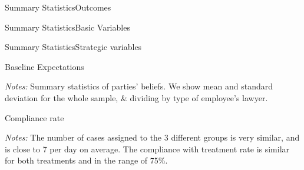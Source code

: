 \documentclass[9pt]{beamer}
\newcommand{\folder}{../Paper/Tables}
\begin{document}



\begin{frame}{Summary Statistics}{Outcomes}
  \begin{table}[H]
    \label{Sum_Stats_outcomes}
    \begin{center}
       \tiny{}
    \end{center}
\end{table}
\end{frame}

\begin{frame}{Summary Statistics}{Basic Variables}
  \begin{table}[H]
    \label{Sum_Stats_basic_variables}
    \begin{center}
       \tiny{}
    \end{center}
\end{table}
\end{frame}

\begin{frame}{Summary Statistics}{Strategic variables}
  \begin{table}[H]
    \label{Sum_Stats_strategic_variables}
    \begin{center}
       \tiny{}
    \end{center}
\end{table}
\end{frame}

\begin{frame}{Baseline Expectations}
\begin{table}[H]
    \label{Table_expectations}
    \begin{center}
       \scriptsize{}
    \end{center}
\end{table}
    \footnotesize    
    \textit{Notes:} 
    Summary statistics of parties' beliefs. We show mean and standard deviation for the whole sample, \& dividing by type of employee's lawyer.
\end{frame}



\begin{frame}{Compliance rate}
 \begin{table}[H]
  \resizebox{0.9\textwidth}{!}{\begin{minipage}{\textwidth}
\label{Table_compliance}
\begin{center}
\scriptsize{}
\end{center}
\end{minipage}}
\end{table}
 \footnotesize
\textit{Notes:} 
The number of cases assigned to the 3 different groups is very similar, and is close to 7 per day on average. The compliance with treatment rate is similar for both treatments and in the range of 75\%.
\end{frame}
\end{document}
